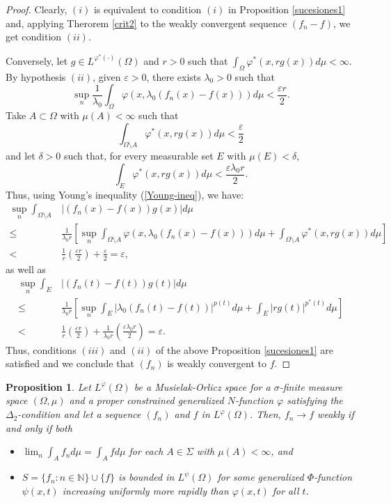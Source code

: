 \documentclass[11pt,a4paper]{amsart}
\newtheorem{proposicion}[definicion]{Proposition}
\newcommand{\lphi}{{L^{\varphi}(\Omega)}}
\newcommand{\lpsi}{{L^{\psi}(\Omega)}}
\begin{document}
\begin{proof}
Clearly, $(i)$ is equivalent to condition $(i)$ in Proposition \ref{sucesiones1} and, applying Therorem \ref{crit2} to the weakly convergent sequence $(f_n-f)$, we get condition $(ii)$.

Conversely, let $g\in L^{\varphi^*(\cdot)}(\Omega)$ and  $r>0$  such that $\int_{\Omega} \varphi^*(x, rg(x))d\mu<\infty$. By hypothesis $(ii)$, given $\varepsilon>0$, there exists $\lambda_0>0$ such that
$$
\sup_{n}\frac{1}{\lambda_0}\int_{\Omega} \varphi(x, \lambda_0 (f_n(x)-f(x))) d\mu < \frac{\varepsilon r}{2}.
$$
Take $A\subset \Omega$ with $\mu(A)<\infty$ such that
$$
\int_{\Omega\setminus A} \varphi^*(x, rg(x))d\mu <\frac{\varepsilon}{2}
$$
and let $\delta>0$  such that, for every measurable set $E$ with $\mu(E)<\delta$,
$$\int_E \varphi^*(x, rg(x))d\mu <\frac{\varepsilon \lambda_0 r}{2}.$$
Thus, using  Young's inequality (\ref{Young-ineq}),  we have:
\begin{align*}
\sup_{n}\int_{\Omega\setminus A} {}  &   \vert (f_n(x)-f(x))g(x)\vert d\mu \\
 \leq{}  &   \frac{1}{\lambda_0 r}\left[\sup_{n}\int_{\Omega\setminus A} \varphi(x, \lambda_0 (f_n(x)-f(x))) d\mu + \int_{\Omega\setminus A} \varphi^*(x, rg(x)) d\mu \right]\\
<{}  &   \frac{1}{r}(\frac{\varepsilon r}{2})+\frac{\varepsilon}{2}
=\varepsilon,
\end{align*}
as well as
\begin{align*}
\sup_{n}\int_E {}  &   \vert (f_n(t)-f(t))g(t)\vert d\mu \\
\leq{}  &   \frac{1}{\lambda_0 r}\left[\sup_{n}\int_E \vert \lambda_0 (f_n(t)-f(t))\vert^{p(t)} d\mu + \int_E \vert rg(t)\vert^{p^{*}(t)} d\mu \right] \\
<{}  &   \frac{1}{r}(\frac{\varepsilon r}{2})+\frac{1}{\lambda_0 r} (\frac{\varepsilon \lambda_0 r}{2})
=\varepsilon.
\end{align*}
Thus, conditions $(iii)$ and $(ii)$ of the above Proposition \ref{sucesiones1} are satisfied and we conclude that $(f_n)$ is weakly convergent to $f$.
\end{proof}


\begin{proposicion}\label{sucesiones3}
Let $\lphi$ be a Musielak-Orlicz space for a $\sigma$-finite measure space $(\Omega,\mu)$ and a proper constrained generalized $N$-function $\varphi$ satisfying the $\Delta_2$-condition and let a sequence $(f_{n})$ and $f$ in $\lphi$. Then, $f_n\rightarrow f$ weakly if and only if both
\begin{itemize}
    \item [$(i)$] $\lim_{n} \int_{A} f_{n} d\mu  = \int_{A} f  d\mu$ for each $A\in \Sigma$ with $\mu(A)<\infty$, and
    \item [$(ii)$] $S=\{f_n:n\in\mathbb{N}\}\cup \{f\}$ is bounded in $\lpsi$ for some generalized $\Phi$-function $\psi(x,t)$ increasing uniformly more rapidly than $\varphi(x,t)$ for all $t$.
\end{itemize}
\end{proposicion}
\end{document}
